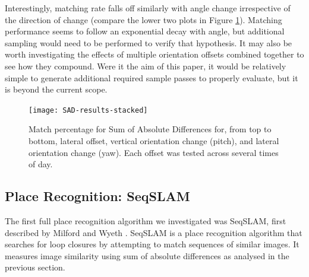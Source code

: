 \documentclass[letterpaper, 10 pt, conference]{ieeeconf}  %
\begin{document}
Interestingly, matching rate falls off similarly with angle change irrespective of the direction of change (compare the lower two plots in Figure \ref{fig:sad-results-stacked}). Matching performance seems to follow an exponential decay with angle, but additional sampling would need to be performed to verify that hypothesis. It may also be worth investigating the effects of multiple orientation offsets combined together to see how they compound. Were it the aim of this paper, it would be relatively simple to generate additional required sample passes to properly evaluate, but it is beyond the current scope.

\begin{figure}[ht]
    \texttt{[image: SAD-results-stacked]}
    \caption{Match percentage for Sum of Absolute Differences for, from top to bottom, lateral offset, vertical orientation change (pitch), and lateral orientation change (yaw). Each offset was tested across several times of day.}
    \label{fig:sad-results-stacked}
\end{figure}




\subsection{Place Recognition: SeqSLAM}

The first full place recognition algorithm we investigated was SeqSLAM, first described by Milford and Wyeth \cite{Milford2012}. SeqSLAM is a place recognition algorithm that searches for loop closures by attempting to match sequences of similar images. It measures image similarity using sum of absolute differences as analysed in the previous section.
\end{document}
